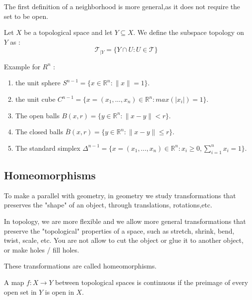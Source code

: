 \documentclass{article}
\begin{document}
The first definition of a neighborhood is more general,as it does not require the set to be open.



\begin{definition}
    Let \(X\) be a topological space and let \(Y \subseteq X \). 
    We define the subspace topology on \(Y \) as : 
    \[
        \mathcal{T}_{\mid Y} = \{Y \cap U : U \in \mathcal{T} \}
    \]
\end{definition}

\begin{example}
    Example for \(R^n \) : 
    \begin{enumerate}
        \item the unit sphere \(S^{n-1} = \{x \in \mathbb{R}^n : \|x\| = 1 \} \).
        \item the unit cube \(C^{n-1} = \{x = (x_1, \ldots, x_n) \in \mathbb{R}^n : max(|x_i|) = 1 \} \).
        \item The open balls \(B(x, r) = \{y \in \mathbb{R}^n : \|x - y\| < r \} \).
        \item The closed balls \(\overline{B}(x, r) = \{y \in \mathbb{R}^n : \|x - y\| \leq r \} \).
        \item The standard simplex \(\Delta^{n-1} = \{x = (x_1, \ldots, x_n) \in \mathbb{R}^n : x_i \geq 0, \sum_{i=1}^n x_i = 1 \} \).
    \end{enumerate}

\end{example}


\subsection{Homeomorphisms}
To make a parallel with geometry, in geometry we study transformations that preserves the "shape" of an object, through translations, rotations,etc.

In topology, we are more flexible and we allow more general transformations that preserve the "topological" properties of a space, such as stretch, shrink, bend, twist, scale, etc. You are not allow to cut the object or glue it to another object, or make holes / fill holes.

These transformations are called homeomorphisms.

\begin{definition}
    A map $f: X \to Y$ between topological spaces is continuous if the preimage of every open set in $Y$ is open in $X$. 
    
\end{definition}
\end{document}
